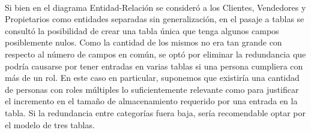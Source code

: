 \documentclass{article}
\begin{document}
\paragraph{}
Si bien en el diagrama Entidad-Relaci\'on se consider\'o a los Clientes, Vendedores y Propietarios como entidades separadas sin generalizaci\'on, en el pasaje a tablas se consult\'o la posibilidad de crear una tabla \'unica que tenga algunos campos posiblemente nulos. Como la cantidad de los mismos no era tan grande con respecto al n\'umero de campos en com\'un, se opt\'o por eliminar la redundancia que podr\'ia causarse por tener entradas en varias tablas si una persona cumpliera con m\'as de un rol.
En este caso en particular, suponemos que existir\'ia una cantidad de personas con roles m\'ultiples lo suficientemente relevante como para justificar el incremento en el tamaño de almacenamiento requerido por una entrada en la tabla. Si la redundancia entre categor\'ias fuera baja, ser\'ia recomendable optar por el modelo de tres tablas.

\newpage

\nocite{*}


\end{document}
